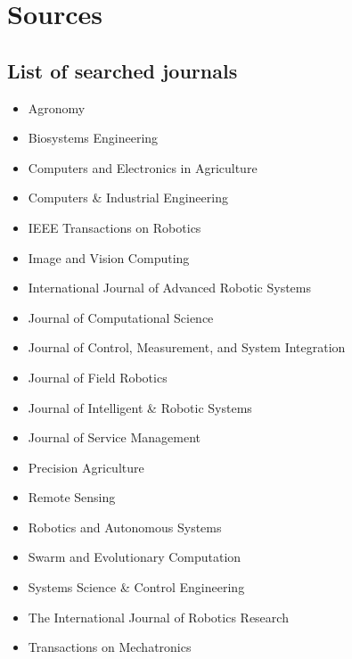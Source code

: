     \section{Sources}

    \subsection{List of searched journals}
    \begin{itemize}
        \item Agronomy
        \item Biosystems Engineering
        \item Computers and Electronics in Agriculture
        \item Computers {\&} Industrial Engineering
        \item IEEE Transactions on Robotics
        \item Image and Vision Computing
        \item International Journal of Advanced Robotic Systems
        \item Journal of Computational Science
        \item Journal of Control, Measurement, and System Integration
        \item Journal of Field Robotics
        \item Journal of Intelligent {\&} Robotic Systems
        \item Journal of Service Management
        \item Precision Agriculture
        \item Remote Sensing
        \item Robotics and Autonomous Systems
        \item Swarm and Evolutionary Computation
        \item Systems Science {\&} Control Engineering
        \item The International Journal of Robotics Research
        \item Transactions on Mechatronics
    \end{itemize}
